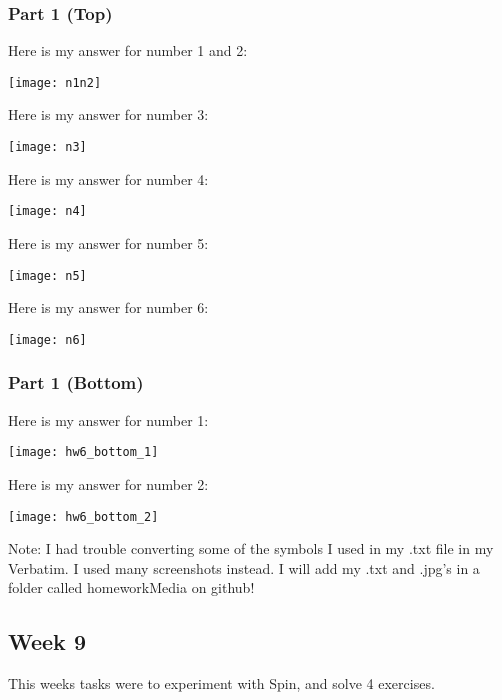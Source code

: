 \documentclass{article}
\theoremstyle{theorem}
\theoremstyle{definition}
\theoremstyle{remark}
\begin{document}
\subsubsection{Part 1 (Top)}
\noindent\newline Here is my answer for number 1 and 2:

\texttt{[image: n1n2]}\noindent\newline

\noindent\newline Here is my answer for number 3:

\texttt{[image: n3]}\noindent\newline

\noindent\newline Here is my answer for number 4:

\texttt{[image: n4]}\noindent\newline

\noindent\newline Here is my answer for number 5:

\texttt{[image: n5]}\noindent\newline

\noindent\newline Here is my answer for number 6:

\texttt{[image: n6]}\noindent\newline

\subsubsection{Part 1 (Bottom)}
\noindent\newline Here is my answer for number 1:

\texttt{[image: hw6\_bottom\_1]}\noindent\newline

\noindent\newline Here is my answer for number 2:

\texttt{[image: hw6\_bottom\_2]}\noindent\newline


\noindent Note: I had trouble converting some of the symbols I used in my .txt file in my Verbatim. I used many screenshots instead. I will add my .txt and .jpg's in a folder called homeworkMedia on github!


\subsection{Week 9}
This weeks tasks were to experiment with Spin, and solve 4 exercises.
\end{document}
